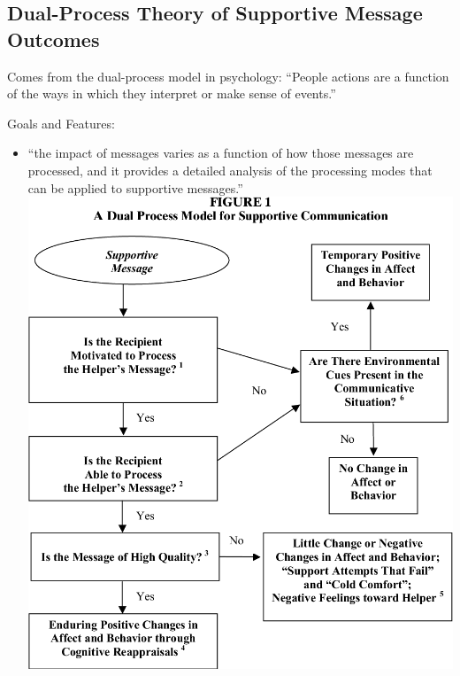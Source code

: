 \documentclass[
]{book}
\begin{document}
\hypertarget{dual-process-theory-of-supportive-message-outcomes}{%
\subsection{Dual-Process Theory of Supportive Message Outcomes}\label{dual-process-theory-of-supportive-message-outcomes}}

Comes from the dual-process model in psychology: ``People actions are a function of the ways in which they interpret or make sense of events.'' \citep[pp.106]{burleson_2010}

Goals and Features:

\begin{itemize}
\item
  ``the impact of messages varies as a function of how those messages are processed, and it provides a detailed analysis of the processing modes that can be applied to supportive messages.''\href{https://www.semanticscholar.org/paper/Understanding-the-outcomes-of-supportive-A-approach-Burleson/34f073a64a9d4e5e092d816202ee415768ceb26e}{\includegraphics{images/9-Figure1-1.png}}

  \citep[pp.198]{Baxter_2008}
\end{itemize}
\end{document}
